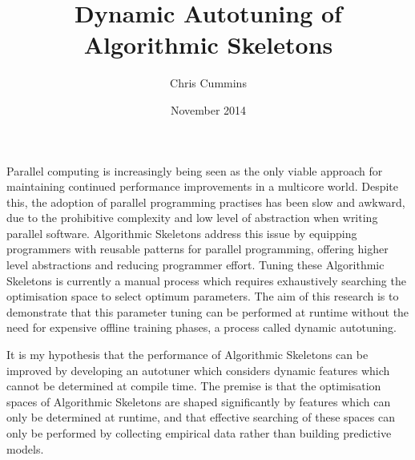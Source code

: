 \title{Dynamic Autotuning of Algorithmic Skeletons}
\author{Chris Cummins}
\date{November 2014}






\maketitle

%
%
%
%
%

Parallel computing is increasingly being seen as the only viable
approach for maintaining continued performance improvements in a
multicore world. Despite this, the adoption of parallel programming
practises has been slow and awkward, due to the prohibitive complexity
and low level of abstraction when writing parallel
software. Algorithmic Skeletons address this issue by equipping
programmers with reusable patterns for parallel programming, offering
higher level abstractions and reducing programmer effort. Tuning these
Algorithmic Skeletons is currently a manual process which requires
exhaustively searching the optimisation space to select optimum
parameters. The aim of this research is to demonstrate that this
parameter tuning can be performed at runtime without the need for
expensive offline training phases, a process called dynamic
autotuning.

It is my hypothesis that the performance of Algorithmic Skeletons can
be improved by developing an autotuner which considers dynamic
features which cannot be determined at compile time. The premise is
that the optimisation spaces of Algorithmic Skeletons are shaped
significantly by features which can only be determined at runtime, and
that effective searching of these spaces can only be performed by
collecting empirical data rather than building predictive models.

